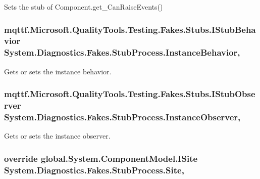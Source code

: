Sets the stub of Component.\-get\-\_\-\-Can\-Raise\-Events()

\hypertarget{class_system_1_1_diagnostics_1_1_fakes_1_1_stub_process_a0a27e6629b921c5895d3675b8e90bbc0}{
\subsubsection[{Instance\-Behavior}]{\setlength{\rightskip}{0pt plus 5cm}mqttf.\-Microsoft.\-Quality\-Tools.\-Testing.\-Fakes.\-Stubs.\-I\-Stub\-Behavior System.\-Diagnostics.\-Fakes.\-Stub\-Process.\-Instance\-Behavior\hspace{0.3cm}{\ttfamily [get]}, {\ttfamily [set]}}}\label{class_system_1_1_diagnostics_1_1_fakes_1_1_stub_process_a0a27e6629b921c5895d3675b8e90bbc0}


Gets or sets the instance behavior.

\hypertarget{class_system_1_1_diagnostics_1_1_fakes_1_1_stub_process_ae5a823ffb8abe586b57463a2c2e4542a}{
\subsubsection[{Instance\-Observer}]{\setlength{\rightskip}{0pt plus 5cm}mqttf.\-Microsoft.\-Quality\-Tools.\-Testing.\-Fakes.\-Stubs.\-I\-Stub\-Observer System.\-Diagnostics.\-Fakes.\-Stub\-Process.\-Instance\-Observer\hspace{0.3cm}{\ttfamily [get]}, {\ttfamily [set]}}}\label{class_system_1_1_diagnostics_1_1_fakes_1_1_stub_process_ae5a823ffb8abe586b57463a2c2e4542a}


Gets or sets the instance observer.

\hypertarget{class_system_1_1_diagnostics_1_1_fakes_1_1_stub_process_af0baff375528a9d5d9cfe92807743bc7}{
\subsubsection[{Site}]{\setlength{\rightskip}{0pt plus 5cm}override global.\-System.\-Component\-Model.\-I\-Site System.\-Diagnostics.\-Fakes.\-Stub\-Process.\-Site\hspace{0.3cm}{\ttfamily [get]}, {\ttfamily [set]}}}\label{class_system_1_1_diagnostics_1_1_fakes_1_1_stub_process_af0baff375528a9d5d9cfe92807743bc7}


